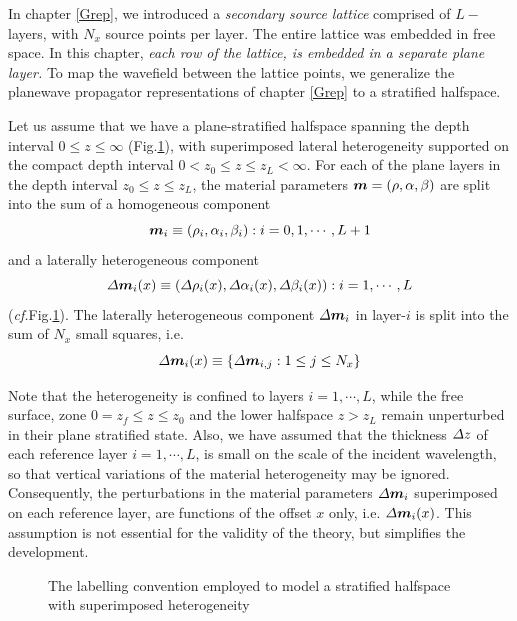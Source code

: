 In chapter \ref{Grep}, we introduced a {\em secondary source lattice\/} 
comprised of $L-$layers, with $N_x$ source points per layer. The entire 
lattice was 
embedded in free space. 
In this chapter, {\em each row of the lattice, is 
embedded in a separate plane layer. 
\/}
To map the wavefield between the lattice points,
we  generalize the planewave  propagator 
representations of chapter \ref{Grep} to a stratified halfspace.

Let us assume that we have a plane-stratified halfspace spanning the depth 
interval $0 \le z \le \infty$ (Fig.\ref{BasicStack}), with superimposed 
lateral heterogeneity supported on the compact depth interval 
$0<z_{0} \le 
z \le z_{L}<\infty$.
For each of the plane layers in the depth interval $z_{0} \le 
z \le z_{L}$, 
the material parameters ${\mbox{\boldmath$\mit m$\unboldmath}}=(\rho,\alpha,\beta)$ are split into the 
sum of a homogeneous component
\[
{\mbox{\boldmath$\mit m$\unboldmath}}_{i}\equiv  \left({ \rho }_{i},{ \alpha }_{i},{ \beta }_{i}
\right):i=0,1,\cdots ,L+1
\]
and a laterally heterogeneous component 
\[
{\mit \Delta}{\mbox{\boldmath$\mit m$\unboldmath}}_{i}(x)\equiv \left({\mit \Delta}{ \rho }_{i}(x),
{\mit \Delta}{\alpha }_{i}(x),{\mit \Delta}{\beta}_{i}(x)\right):i=1,\cdots ,L
\]
({\em cf.\/}Fig.\ref{BasicStack}). The laterally heterogeneous component 
${\mit \Delta}{\mbox{\boldmath$\mit m$\unboldmath}}_{i}$ in layer-$i$ is split 
into the sum of $N_x$ small squares, i.e.  
\[
{\mit \Delta}{\mbox{\boldmath$\mit m$\unboldmath}}_{i}(x)\equiv \{ {\mit \Delta}{\mbox{\boldmath$\mit m$\unboldmath}}_{i,j}: 1 
\le j \le N_x \}
\]


Note that the heterogeneity is confined to layers $i=1,\cdots ,L$, while 
the free surface, zone $0=z_{f}\le z \le z_{0}$ and the lower halfspace $z>z_{L}$
remain unperturbed in their plane stratified state. Also, we have 
assumed that the thickness ${\mit \Delta}z$ of each reference layer
$i=1,\cdots ,L$, is small on the scale of the incident wavelength, so 
that vertical variations of the material heterogeneity may be ignored. 
Consequently, 
the perturbations in the material parameters ${\mit \Delta}{\mbox{\boldmath$\mit m$\unboldmath}}_{i}$ 
superimposed on each reference layer, 
are functions of the offset $x$ only, i.e. ${\mit \Delta}{\mbox{\boldmath$\mit m$\unboldmath}}_{i}(x)$. This 
assumption is not essential for the validity of the theory, but simplifies the development.

\begin{figure}
\HideDisplacementBoxes
\centerline{}
\caption{The  labelling convention employed to model a stratified 
halfspace with superimposed heterogeneity}
\protect\label{BasicStack}
\end{figure}



